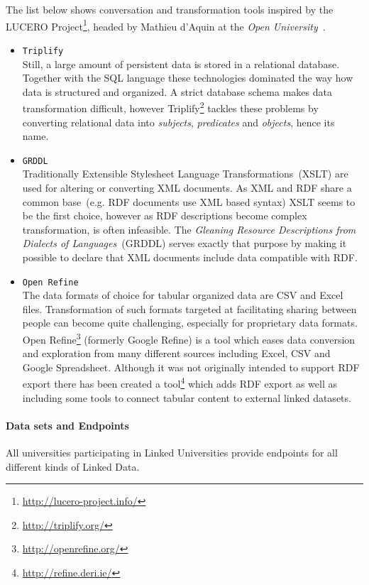 \documentclass{article}
\begin{document}
The list below shows conversation and transformation tools inspired by the LUCERO Project\footnote{\url{http://lucero-project.info/}}, headed by 
Mathieu d'Aquin at the \textit{Open University}~\cite{inproceedings:open_university}.
\begin{itemize}
	\item \texttt{Triplify}~\\
		Still, a large amount of persistent data is stored in a relational database. Together with the SQL language these technologies dominated the way how data is structured and organized. A strict database schema makes data transformation difficult, however Triplify\footnote{\url{http://triplify.org/}} tackles these problems by converting relational data into \textit{subjects}, \textit{predicates} and \textit{objects}, hence its name. 
	\item \texttt{GRDDL}~\\
		Traditionally Extensible Stylesheet Language Transformations~(XSLT) are used for altering or converting XML documents. As XML and RDF share a common base~(e.g. RDF documents use XML based syntax) XSLT seems to be the first choice, however as RDF descriptions become complex transformation, is often infeasible. The \textit{Gleaning Resource Descriptions from Dialects of Languages}~(GRDDL)\cite{jour:grddl} serves exactly that purpose by making it possible to declare that XML documents include data compatible with RDF. 
	\item \texttt{Open Refine}~\\
		The data formats of choice for tabular organized data are CSV and Excel files. Transformation of such formats targeted at facilitating sharing between people can become quite challenging, especially for proprietary data formats. Open Refine\footnote{\url{http://openrefine.org/}} (formerly Google Refine) is a tool which eases data conversion and exploration from many different sources including Excel, CSV and Google Spreadsheet. Although it was not originally intended to support RDF export there has been created a tool\footnote{\url{http://refine.deri.ie/}} which adds RDF export as well as including some tools to connect tabular content to external linked datasets. 
\end{itemize}


\paragraph{Data sets and Endpoints}
All universities participating in Linked Universities provide endpoints for all different kinds of Linked Data.
\end{document}
